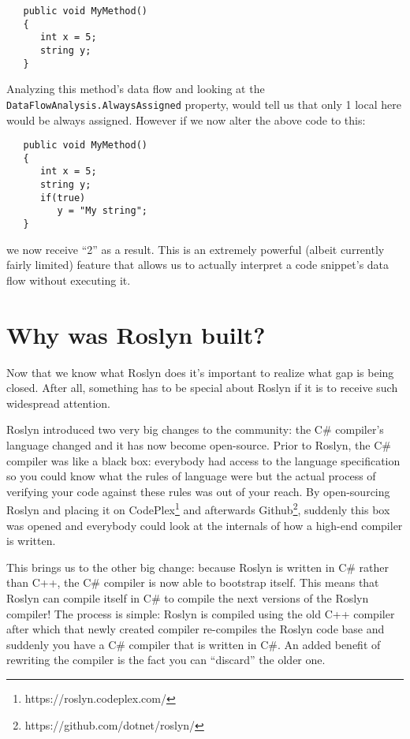 \begin{lstlisting}
   public void MyMethod()
   {
      int x = 5;
      string y;
   }

\end{lstlisting}
	
Analyzing this method’s data flow and looking at the \verb|DataFlowAnalysis.AlwaysAssigned| property, would tell us that only 1 local here would be always assigned. However if we now alter the above code to this:

\begin{lstlisting}
   public void MyMethod()
   {
      int x = 5;
      string y;
      if(true)
         y = "My string";
   }
\end{lstlisting}
	
we now receive “2” as a result. This is an extremely powerful (albeit currently fairly limited) feature that allows us to actually interpret a code snippet’s data flow without executing it.


\section{Why was Roslyn built?}
\label{sec:intro-why}

Now that we know what Roslyn does it’s important to realize what gap is being closed. After all, something has to be special about Roslyn if it is to receive such widespread attention.

Roslyn introduced two very big changes to the community: the C\# compiler’s language changed and it has now become open-source. Prior to Roslyn, the C\# compiler was like a black box: everybody had access to the language specification so you could know what the rules of language were but the actual process of verifying your code against these rules was out of your reach. By open-sourcing Roslyn and placing it on CodePlex\footnote{https://roslyn.codeplex.com/} and afterwards Github\footnote{https://github.com/dotnet/roslyn/}, suddenly this box was opened and everybody could look at the internals of how a high-end compiler is written.

This brings us to the other big change: because Roslyn is written in C\# rather than C++, the C\# compiler is now able to bootstrap itself. This means that Roslyn can compile itself in C\# to compile the next versions of the Roslyn compiler! The process is simple: Roslyn is compiled using the old C++ compiler after which that newly created compiler re-compiles the Roslyn code base and suddenly you have a C\# compiler that is written in C\#. 
An added benefit of rewriting the compiler is the fact you can “discard” the older one.

